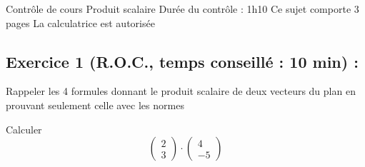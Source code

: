 

\usepackage[c]{esvect}
\newcommand{\covec}[2]{\begin{pmatrix}#1 \\#2 \end{pmatrix}}


\center
\Large Contrôle de cours
\flushleft
\center
Produit scalaire
\flushleft \normalsize
Durée du contrôle : 1h10\newline
Ce sujet comporte 3 pages\newline
La calculatrice est autorisée
\subsection*{Exercice 1 (R.O.C., temps conseillé : 10 min) : }
Rappeler les 4 formules donnant le produit scalaire de deux vecteurs du plan en prouvant seulement celle avec les normes\newline

Calculer 
$$\covec{2}{3} \cdot \covec{4}{-5}$$
